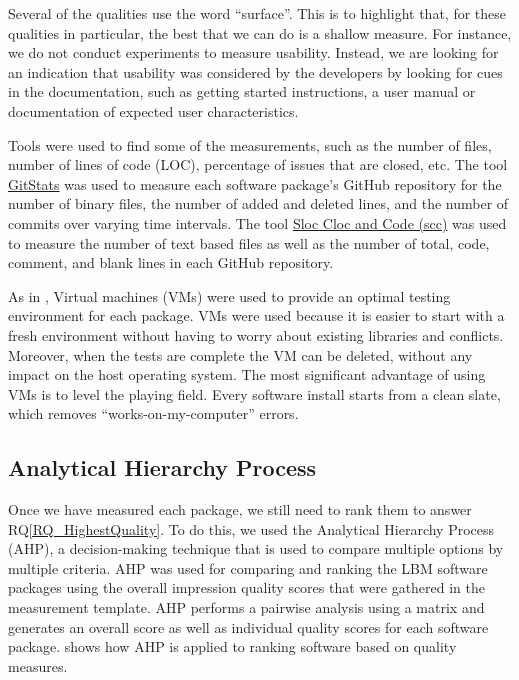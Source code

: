 \documentclass[final, 3p, times, authoryear]{elsarticle}
\newcommand{\rqref}[1]{RQ\ref{#1}}
\begin{document}
Several of the qualities use the word ``surface''.  This is to highlight that,
for these qualities in particular, the best that we can do is a shallow measure.
For instance, we do not conduct experiments to measure usability. Instead, we
are looking for an indication that usability was considered by the developers by
looking for cues in the documentation, such as getting started instructions, a
user manual or documentation of expected user characteristics.

Tools were used to find some of the measurements, such as the number of files,
number of lines of code (LOC), percentage of issues that are closed, etc. The
tool \href{https://github.com/tomgi/git_stats}{GitStats} was used to measure
each software package's GitHub repository for the number of binary files, the
number of added and deleted lines, and the number of commits over varying time
intervals. The tool \href{https://github.com/boyter/scc}{Sloc Cloc and Code
(scc)} was used to measure the number of text based files as well as the number
of total, code, comment, and blank lines in each GitHub repository.

As in \citet{SmithEtAl2016}, Virtual machines (VMs) were used to provide an
optimal testing environment for each package. VMs were used because it is
easier to start with a fresh environment without having to worry about existing
libraries and conflicts. Moreover, when the tests are complete the VM can be
deleted, without any impact on the host operating system. The most significant
advantage of using VMs is to level the playing field. Every software install
starts from a clean slate, which removes ``works-on-my-computer'' errors.

\subsection{Analytical Hierarchy Process} \label{AHP}

Once we have measured each package, we still need to rank them to answer
\rqref{RQ_HighestQuality}.  To do this, we used the Analytical Hierarchy Process
(AHP), a decision-making technique that is used to compare multiple options by
multiple criteria. AHP was used for comparing and ranking the LBM software
packages using the overall impression quality scores that were gathered in the
measurement template.  AHP performs a pairwise analysis using a matrix and
generates an overall score as well as individual quality scores for each
software package. \citep{SmithEtAl2016} shows how AHP is applied to ranking
software based on quality measures. 
\end{document}
